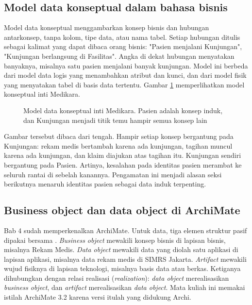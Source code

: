 \subsection*{Model data konseptual dalam bahasa bisnis}

Model data konseptual menggambarkan konsep bisnis dan hubungan antarkonsep,
tanpa kolom, tipe data, atau nama tabel. Setiap hubungan ditulis sebagai
kalimat yang dapat dibaca orang bisnis: "Pasien menjalani Kunjungan",
"Kunjungan berlangsung di Fasilitas". Angka di dekat hubungan menyatakan
banyaknya, misalnya satu pasien menjalani banyak kunjungan. Model ini
berbeda dari model data logis yang menambahkan atribut dan kunci, dan dari
model fisik yang menyatakan tabel di basis data tertentu. Gambar
\ref{fig:ch06-model-konseptual} memperlihatkan model konseptual inti Medikara.

\begin{figure}[!htb]
  \centering
  
  \caption{Model data konseptual inti Medikara. Pasien adalah konsep induk, dan
           Kunjungan menjadi titik temu hampir semua konsep lain}
  \label{fig:ch06-model-konseptual}
\end{figure}

Gambar tersebut dibaca dari tengah. Hampir setiap konsep bergantung pada
Kunjungan: rekam medis bertambah karena ada kunjungan, tagihan muncul karena
ada kunjungan, dan klaim diajukan atas tagihan itu. Kunjungan sendiri
bergantung pada Pasien. Artinya, kesalahan pada identitas pasien merambat ke
seluruh rantai di sebelah kanannya. Pengamatan ini menjadi alasan seksi
berikutnya menaruh identitas pasien sebagai data induk terpenting.

\subsection*{Business object dan data object di ArchiMate}

Bab 4 sudah memperkenalkan ArchiMate. Untuk data, tiga elemen struktur pasif
dipakai bersama \cite{archimate32}. \textit{Business object} mewakili konsep
bisnis di lapisan bisnis, misalnya Rekam Medis. \textit{Data object} mewakili
data yang diolah satu aplikasi di lapisan aplikasi, misalnya data rekam medis
di SIMRS Jakarta. \textit{Artifact} mewakili wujud fisiknya di lapisan
teknologi, misalnya basis data atau berkas. Ketiganya dihubungkan dengan relasi
realisasi (\textit{realization}): \textit{data object} merealisasikan
\textit{business object}, dan \textit{artifact} merealisasikan \textit{data
object}. Mata kuliah ini memakai istilah ArchiMate 3.2 karena versi itulah yang
didukung Archi.

